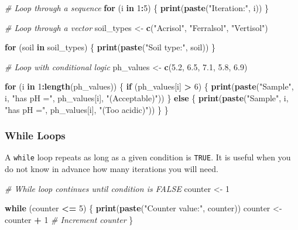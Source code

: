 \documentclass[
  10pt,
  b5paper,
  oneside]{book}
\newenvironment{Shaded}{\begin{snugshade}}{\end{snugshade}}
\newcommand{\CommentTok}[1]{\textcolor[rgb]{0.56,0.35,0.01}{\textit{#1}}}
\newcommand{\ControlFlowTok}[1]{\textcolor[rgb]{0.13,0.29,0.53}{\textbf{#1}}}
\newcommand{\DecValTok}[1]{\textcolor[rgb]{0.00,0.00,0.81}{#1}}
\newcommand{\FloatTok}[1]{\textcolor[rgb]{0.00,0.00,0.81}{#1}}
\newcommand{\FunctionTok}[1]{\textcolor[rgb]{0.13,0.29,0.53}{\textbf{#1}}}
\newcommand{\NormalTok}[1]{#1}
\newcommand{\OtherTok}[1]{\textcolor[rgb]{0.56,0.35,0.01}{#1}}
\newcommand{\SpecialCharTok}[1]{\textcolor[rgb]{0.81,0.36,0.00}{\textbf{#1}}}
\newcommand{\StringTok}[1]{\textcolor[rgb]{0.31,0.60,0.02}{#1}}
\begin{document}
\begin{Shaded}
\begin{Highlighting}[]
\CommentTok{\# Loop through a sequence}
\ControlFlowTok{for}\NormalTok{ (i }\ControlFlowTok{in} \DecValTok{1}\SpecialCharTok{:}\DecValTok{5}\NormalTok{) \{}
  \FunctionTok{print}\NormalTok{(}\FunctionTok{paste}\NormalTok{(}\StringTok{"Iteration:"}\NormalTok{, i))}
\NormalTok{\}}

\CommentTok{\# Loop through a vector}
\NormalTok{soil\_types }\OtherTok{\textless{}{-}} \FunctionTok{c}\NormalTok{(}\StringTok{"Acrisol"}\NormalTok{, }\StringTok{"Ferralsol"}\NormalTok{, }\StringTok{"Vertisol"}\NormalTok{)}

\ControlFlowTok{for}\NormalTok{ (soil }\ControlFlowTok{in}\NormalTok{ soil\_types) \{}
  \FunctionTok{print}\NormalTok{(}\FunctionTok{paste}\NormalTok{(}\StringTok{"Soil type:"}\NormalTok{, soil))}
\NormalTok{\}}

\CommentTok{\# Loop with conditional logic}
\NormalTok{ph\_values }\OtherTok{\textless{}{-}} \FunctionTok{c}\NormalTok{(}\FloatTok{5.2}\NormalTok{, }\FloatTok{6.5}\NormalTok{, }\FloatTok{7.1}\NormalTok{, }\FloatTok{5.8}\NormalTok{, }\FloatTok{6.9}\NormalTok{)}

\ControlFlowTok{for}\NormalTok{ (i }\ControlFlowTok{in} \DecValTok{1}\SpecialCharTok{:}\FunctionTok{length}\NormalTok{(ph\_values)) \{}
  \ControlFlowTok{if}\NormalTok{ (ph\_values[i] }\SpecialCharTok{\textgreater{}} \DecValTok{6}\NormalTok{) \{}
    \FunctionTok{print}\NormalTok{(}\FunctionTok{paste}\NormalTok{(}\StringTok{"Sample"}\NormalTok{, i, }\StringTok{"has pH ="}\NormalTok{, ph\_values[i], }\StringTok{"(Acceptable)"}\NormalTok{))}
\NormalTok{  \} }\ControlFlowTok{else}\NormalTok{ \{}
    \FunctionTok{print}\NormalTok{(}\FunctionTok{paste}\NormalTok{(}\StringTok{"Sample"}\NormalTok{, i, }\StringTok{"has pH ="}\NormalTok{, ph\_values[i], }\StringTok{"(Too acidic)"}\NormalTok{))}
\NormalTok{  \}}
\NormalTok{\}}
\end{Highlighting}
\end{Shaded}

\subsubsection{While Loops}\label{while-loop}

A \texttt{while} loop repeats as long as a given condition is \texttt{TRUE}. It is useful when you do not know in advance how many iterations you will need.

\begin{Shaded}
\begin{Highlighting}[]
\CommentTok{\# While loop continues until condition is FALSE}
\NormalTok{counter }\OtherTok{\textless{}{-}} \DecValTok{1}

\ControlFlowTok{while}\NormalTok{ (counter }\SpecialCharTok{\textless{}=} \DecValTok{5}\NormalTok{) \{}
  \FunctionTok{print}\NormalTok{(}\FunctionTok{paste}\NormalTok{(}\StringTok{"Counter value:"}\NormalTok{, counter))}
\NormalTok{  counter }\OtherTok{\textless{}{-}}\NormalTok{ counter }\SpecialCharTok{+} \DecValTok{1}   \CommentTok{\# Increment counter}
\NormalTok{\}}
\end{Highlighting}
\end{Shaded}
\end{document}
